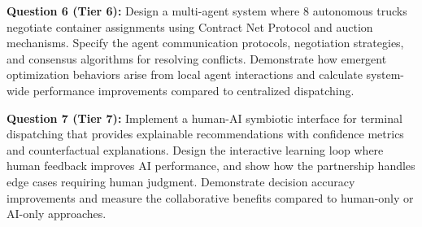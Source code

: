 \documentclass{article}
\begin{document}
\textbf{Question 6 (Tier 6):} Design a multi-agent system where 8 autonomous trucks negotiate container assignments using Contract Net Protocol and auction mechanisms. Specify the agent communication protocols, negotiation strategies, and consensus algorithms for resolving conflicts. Demonstrate how emergent optimization behaviors arise from local agent interactions and calculate system-wide performance improvements compared to centralized dispatching.

\textbf{Question 7 (Tier 7):} Implement a human-AI symbiotic interface for terminal dispatching that provides explainable recommendations with confidence metrics and counterfactual explanations. Design the interactive learning loop where human feedback improves AI performance, and show how the partnership handles edge cases requiring human judgment. Demonstrate decision accuracy improvements and measure the collaborative benefits compared to human-only or AI-only approaches.
\end{document}
